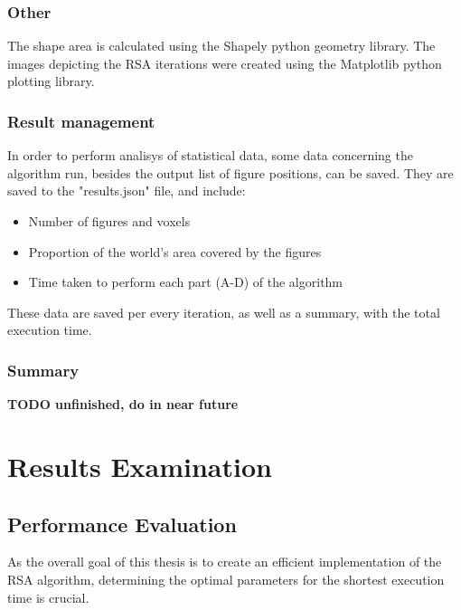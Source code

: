 \documentclass[12pt, oneside]{report}
\begin{document}
\subsection{Other}

The shape area is calculated using the Shapely python geometry library.\autocite[1]{shapely} \newline
The images depicting the RSA iterations were created using the Matplotlib python plotting library.\autocite[1]{matplotlib}

\subsection{Result management}

In order to perform analisys of statistical data, some data concerning the algorithm run, besides the output list of figure positions, can be saved. They are saved to the "results.json" file, and include:
\begin{itemize}
  \item Number of figures and voxels
 	\item Proportion of the world's area covered by the figures
	\item Time taken to perform each part (A-D) of the algorithm
\end{itemize}
These data are saved per every iteration, as well as a summary, with the total execution time.

\subsection{Summary}

\textbf{TODO unfinished, do in near future}


\chapter{Results Examination}
\section{Performance Evaluation}

As the overall goal of this thesis is to create an efficient implementation of the RSA algorithm, determining the optimal parameters for the shortest execution time is crucial.
\end{document}

